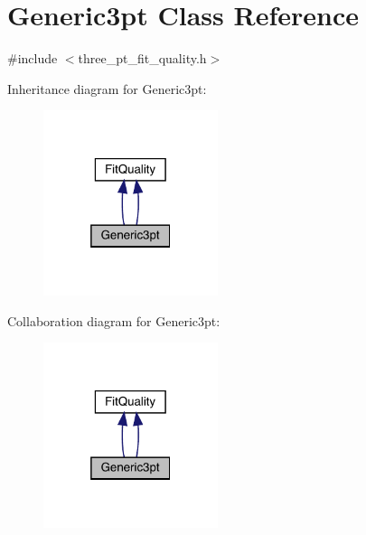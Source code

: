 \hypertarget{classGeneric3pt}{}\section{Generic3pt Class Reference}
\label{classGeneric3pt}


{\ttfamily \#include $<$three\+\_\+pt\+\_\+fit\+\_\+quality.\+h$>$}



Inheritance diagram for Generic3pt\+:
\nopagebreak
\begin{figure}[H]
\begin{center}
\leavevmode
\includegraphics[width=145pt]{d9/d5a/classGeneric3pt__inherit__graph}
\end{center}
\end{figure}


Collaboration diagram for Generic3pt\+:
\nopagebreak
\begin{figure}[H]
\begin{center}
\leavevmode
\includegraphics[width=145pt]{db/d21/classGeneric3pt__coll__graph}
\end{center}
\end{figure}
